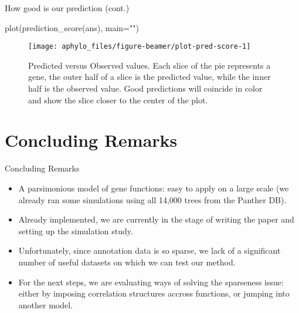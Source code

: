 \documentclass[9pt,ignorenonframetext,]{beamer}
\newenvironment{Shaded}{\begin{snugshade}}{\end{snugshade}}
\newcommand{\KeywordTok}[1]{\textcolor[rgb]{0.94,0.87,0.69}{#1}}
\newcommand{\DataTypeTok}[1]{\textcolor[rgb]{0.87,0.87,0.75}{#1}}
\newcommand{\StringTok}[1]{\textcolor[rgb]{0.80,0.58,0.58}{#1}}
\newcommand{\NormalTok}[1]{\textcolor[rgb]{0.80,0.80,0.80}{#1}}
\begin{document}
\begin{frame}[fragile,t]{How good is our prediction (cont.)}

\footnotesize

\begin{Shaded}
\begin{Highlighting}[]
\KeywordTok{plot}\NormalTok{(}\KeywordTok{prediction_score}\NormalTok{(ans), }\DataTypeTok{main=}\StringTok{""}\NormalTok{)}
\end{Highlighting}
\end{Shaded}

\begin{figure}

{\centering \texttt{[image: aphylo\_files/figure-beamer/plot-pred-score-1]} 

}

\caption{Predicted versus Observed values. Each slice of the pie represents a gene, the outer half of a slice is the predicted value, while the inner half is the observed value. Good predictions will coincide in color and show the slice closer to the center of the plot.}\label{fig:plot-pred-score}
\end{figure}

\normalsize

\end{frame}

\section{Concluding Remarks}\label{concluding-remarks}

\begin{frame}{Concluding Remarks}

\begin{itemize}
\item
  A parsimonious model of gene functions: easy to apply on a large scale
  (we already ran some simulations using all 14,000 trees from the
  Panther DB).\pause
\item
  Already implemented, we are currently in the stage of writing the
  paper and setting up the simulation study.\pause
\item
  Unfortunately, since annotation data is so sparse, we lack of a
  significant number of useful datasets on which we can test our
  method.\pause
\item
  For the next steps, we are evaluating ways of solving the sparseness
  issue: either by imposing correlation structures accross functions, or
  jumping into another model.\pause
\end{itemize}

\end{frame}
\end{document}
